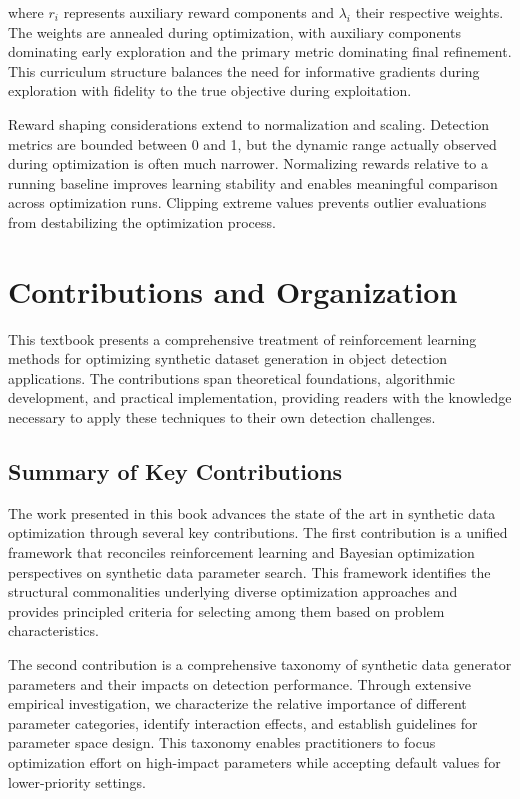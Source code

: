 where $r_i$ represents auxiliary reward components and $\lambda_i$ their respective weights. The weights are annealed during optimization, with auxiliary components dominating early exploration and the primary metric dominating final refinement. This curriculum structure balances the need for informative gradients during exploration with fidelity to the true objective during exploitation.

Reward shaping considerations extend to normalization and scaling. Detection metrics are bounded between 0 and 1, but the dynamic range actually observed during optimization is often much narrower. Normalizing rewards relative to a running baseline improves learning stability and enables meaningful comparison across optimization runs. Clipping extreme values prevents outlier evaluations from destabilizing the optimization process.

\section{Contributions and Organization}
\label{sec:contributions}

This textbook presents a comprehensive treatment of reinforcement learning methods for optimizing synthetic dataset generation in object detection applications. The contributions span theoretical foundations, algorithmic development, and practical implementation, providing readers with the knowledge necessary to apply these techniques to their own detection challenges.

\subsection{Summary of Key Contributions}
\label{subsec:key_contributions}

The work presented in this book advances the state of the art in synthetic data optimization through several key contributions. The first contribution is a unified framework that reconciles reinforcement learning and Bayesian optimization perspectives on synthetic data parameter search. This framework identifies the structural commonalities underlying diverse optimization approaches and provides principled criteria for selecting among them based on problem characteristics.

The second contribution is a comprehensive taxonomy of synthetic data generator parameters and their impacts on detection performance. Through extensive empirical investigation, we characterize the relative importance of different parameter categories, identify interaction effects, and establish guidelines for parameter space design. This taxonomy enables practitioners to focus optimization effort on high-impact parameters while accepting default values for lower-priority settings.

